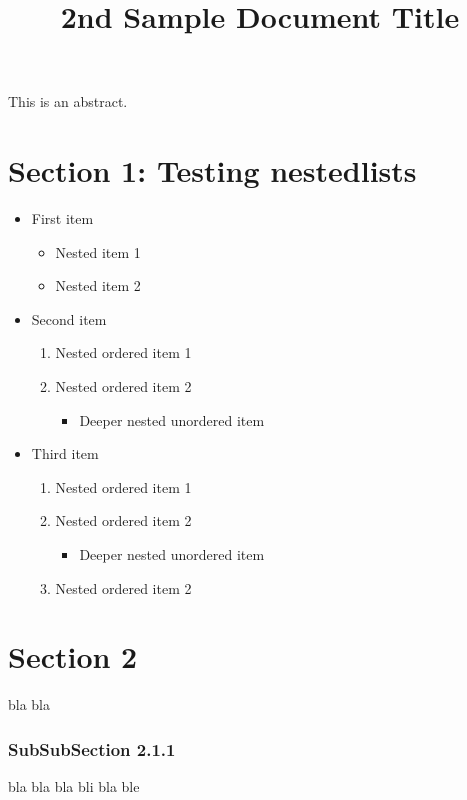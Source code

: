 \documentclass[11pt,a4paper]{article}
\title{2nd Sample Document Title}
\begin{document}
\maketitle

This is an abstract.

\section{Section 1: Testing nestedlists}

\begin{itemize}
\item First item
  \begin{itemize}
\item Nested item 1
\item Nested item 2
  \end{itemize}
\item Second item
  \begin{enumerate}
\item Nested ordered item 1
\item Nested ordered item 2
    \begin{itemize}
\item Deeper nested unordered item
    \end{itemize}
  \end{enumerate}
\item Third item
  \begin{enumerate}
\item Nested ordered item 1
\item Nested ordered item 2
    \begin{itemize}
\item Deeper nested unordered item
    \end{itemize}
\item Nested ordered item 2
  \end{enumerate}
\end{itemize}

\section{Section 2}

bla bla

\subsubsection{SubSubSection 2.1.1}

bla bla bla bli bla ble
\end{document}

